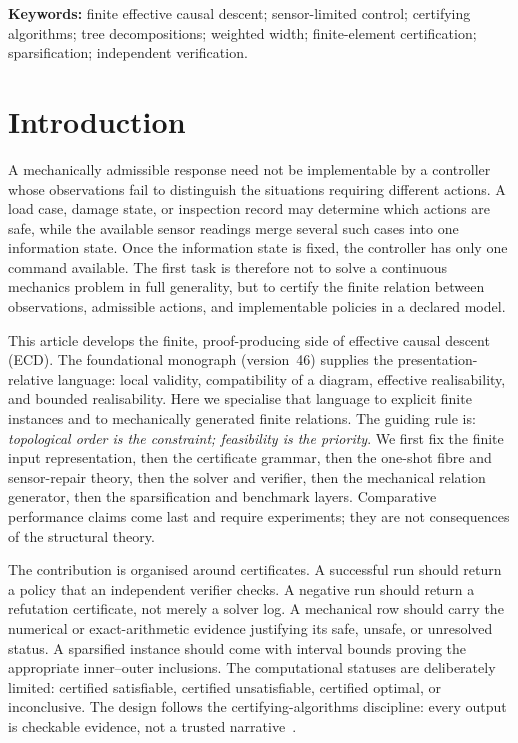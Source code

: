 \documentclass[11pt]{article}
\theoremstyle{plain}
\theoremstyle{definition}
\theoremstyle{remark}
\begin{document}
\noindent\textbf{Keywords:} finite effective causal descent; sensor-limited control;
certifying algorithms; tree decompositions; weighted width; finite-element
certification; sparsification; independent verification.

\tableofcontents

\section{Introduction}
\label{sec:introduction}

A mechanically admissible response need not be implementable by a controller
whose observations fail to distinguish the situations requiring different
actions.  A load case, damage state, or inspection record may determine which
actions are safe, while the available sensor readings merge several such cases
into one information state.  Once the information state is fixed, the controller
has only one command available.  The first task is therefore not to solve a
continuous mechanics problem in full generality, but to certify the finite
relation between observations, admissible actions, and implementable policies in
a declared model.

This article develops the finite, proof-producing side of effective causal
descent (ECD).  The foundational monograph (version~46) supplies the presentation-relative
language: local validity, compatibility of a diagram, effective realisability,
and bounded realisability.  Here we specialise that language to explicit finite
instances and to mechanically generated finite relations.  The guiding rule is:
\emph{topological order is the constraint; feasibility is the priority}.  We
first fix the finite input representation, then the certificate grammar, then
the one-shot fibre and sensor-repair theory, then the solver and verifier,
then the mechanical relation generator, then the sparsification and benchmark
layers.  Comparative performance claims come last
and require experiments; they are not consequences of the structural theory.

The contribution is organised around certificates.  A successful run should
return a policy that an independent verifier checks.  A negative run should
return a refutation certificate, not merely a solver log.  A mechanical row
should carry the numerical or exact-arithmetic evidence justifying its safe,
unsafe, or unresolved status.  A sparsified instance should come with interval
bounds proving the appropriate inner--outer inclusions.  The computational
statuses are deliberately limited: certified satisfiable, certified
unsatisfiable, certified optimal, or inconclusive.  The design follows the
certifying-algorithms discipline: every output is checkable evidence, not a
trusted narrative~\cite{mcm11}.
\end{document}
